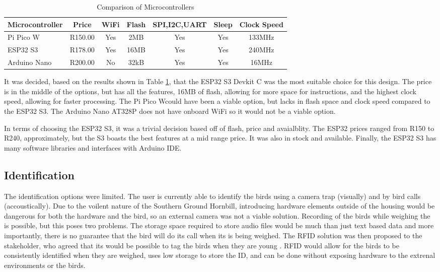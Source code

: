 \documentclass[class=report,11pt,crop=false]{standalone}
\begin{document}
\begin{table}[htbp]
    \centering
    \small
    {\begin{tabular}{|l|c|c|c|c|c|c|}
        \hline
        \textbf{Microcontroller} & \textbf{Price} & \textbf{WiFi} & \textbf{Flash} & \textbf{SPI,I2C,UART} & \textbf{Sleep} & \textbf{Clock Speed} \\
        \hline
        Pi Pico W & R150.00 & Yes & 2MB & Yes & Yes & 133MHz\\ 
        ESP32 S3  & R178.00 & Yes & 16MB & Yes & Yes & 240MHz\\
        Arduino Nano  & R200.00 & No & 32kB & Yes & Yes & 16MHz\\
        \hline
    \end{tabular}}
    \caption{Comparison of Microcontrollers \cite{arduino}\cite{esp32}\cite{pico}}
    \label{tab:mcu_comparison}
\end{table}

It was decided, based on the results shown in Table \ref{tab:mcu_comparison}, that the ESP32 S3 Devkit C was the most suitable choice for this design. The price is in the middle of the options, but has all the features, 16MB of flash, allowing for more space for instructions, and the highest clock speed, allowing for faster processing. The Pi Pico Wcould have been a viable option, but lacks in flash space and clock speed compared to the ESP32 S3. The Arduino Nano AT328P does not have onboard WiFi so it would not be a viable option.

In terms of choosing the ESP32 S3, it was a trivial decision based off of flash, price and avaialblity. The ESP32 prices ranged from R150 to R240, approximately, but the S3 boasts the best features at a mid range price. It was also in stock and available. Finally, the ESP32 S3 has many software libraries and interfaces with Arduino IDE. 

\subsection*{Identification}

The identification options were limited. The user is currently able to identify the birds using a camera trap (visually) and by bird calls (accoustically). Due to the voilent nature of the Southern Ground Hornbill, introducing hardware elements outside of the housing would be dangerous for both the hardware and the bird, so an external camera was not a viable solution. Recording of the birds while weighing the is possible, but this poses two problems. The storage space required to store audio files would be much than just text based data and more importantly, there is no guarantee that the bird will do its call when its is being weighed. The RFID solution was then proposed to the stakeholder, who agreed that its would be possible to tag the birds when they are young \cite{stakeholder}. RFID would allow for the birds to be consistently identified when they are weighed, uses low storage to store the ID, and can be done without exposing hardware to the extrenal environments or the birds.
\end{document}
